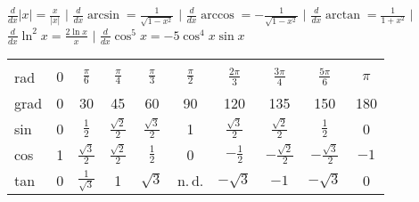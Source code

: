 \documentclass[a3paper, ngerman, 8pt]{article}
\begin{document}
\begin{multicols*}{3}
$\frac{d}{dx} |x| = \frac{x}{|x|}$ $\big \vert$ $\frac{d}{dx} \arcsin = 
\frac{1}{\sqrt{1-x^2}}$ $\big \vert$ $\frac{d}{dx} \arccos = -\frac{1}{\sqrt{1-x^2}}$ 
$\big \vert$ $\frac{d}{dx} \arctan = \frac{1}{1+x^2}$ $\big \vert$ $\frac{d}{dx} 
\ln^2x = \frac{2\ln x}{x}$ $\big \vert$ $\frac{d}{dx}\cos^5 x = -5\cos^4 x\sin x$

{\scriptsize
\vspace{2ex}
\begin{tabular}{lccccccccc}
    \hline \\
    rad     & $0$ & $\frac{\pi}{6}$ & $\frac{\pi}{4}$ & $\frac{\pi}{3}$ & 
    $\frac{\pi}{2}$ & $\frac{2 \pi}{3}$ & $\frac{3\pi}{4}$
                    & $\frac{5\pi}{6}$ & $\pi$ \\[1.2ex]

                    grad    & 0 & 30 & 45 & 60 & 90 & 120 & 135 & 150 & 180 \\[1.2ex]

    sin     & 0 & $\frac{1}{2}$ & $\frac{\sqrt{2}}{2}$ & $\frac{\sqrt{3}}{2}$ &
    1 & $\frac{\sqrt{3}}{2}$ & $\frac{\sqrt{2}}{2}$ & $\frac{1}{2}$ & 0
    \\[1.2ex]

    cos     & 1 & $\frac{\sqrt{3}}{2}$ & $\frac{\sqrt{2}}{2}$ & $\frac{1}{2}$ &
    0 & $-\frac{1}{2}$ & $-\frac{\sqrt{2}}{2}$ & $-\frac{\sqrt{3}}{2}$ & $-1$
    \\[1.2ex]

    tan     & 0 & $\frac{1}{\sqrt{3}}$ & 1 & $\sqrt{3}$ & n.\,d. & $-\sqrt{3}$ &
    $-1$ & $-\sqrt{3}$ & 0 \\[2ex]
    \hline
\end{tabular}
\vspace{2ex}
}





\end{multicols*}
\end{document}
